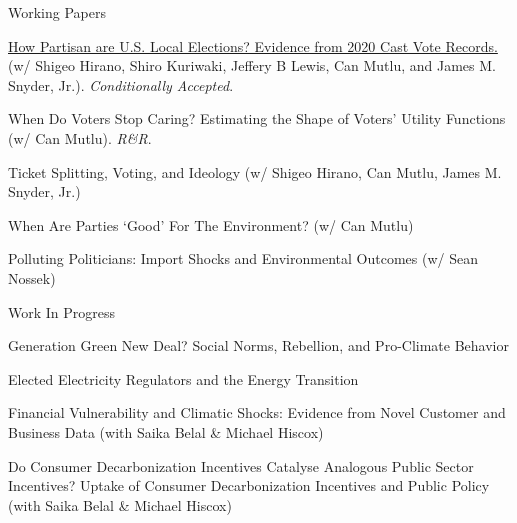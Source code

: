 \documentclass{resume}
\begin{document}
\begin{rSection}{\Large W\MakeLowercase{orking} P\MakeLowercase{apers}} \itemsep -3pt {}
\vspace{-0.7cm}

 
\item \href{https://osf.io/preprints/osf/db3mj}{How Partisan are U.S. Local Elections? Evidence from 2020 Cast Vote Records.} (w/ Shigeo Hirano, Shiro Kuriwaki, Jeffery B Lewis, Can Mutlu, and James M. Snyder, Jr.). \textit{Conditionally Accepted}.

\medskip

\item When Do Voters Stop Caring? Estimating the Shape of Voters' Utility Functions (w/ Can Mutlu). \textit{R\&R}.

\medskip

\item Ticket Splitting, Voting, and Ideology (w/ Shigeo Hirano, Can Mutlu, James M. Snyder, Jr.)

\medskip 

\item When Are Parties `Good' For The Environment?  (w/ Can Mutlu)


\medskip

\item Polluting Politicians: Import Shocks and Environmental Outcomes (w/ Sean Nossek)

\end{rSection}

\bigskip


\begin{rSection}{\Large W\MakeLowercase{ork} I\MakeLowercase{n} P\MakeLowercase{rogress}} \itemsep -2pt {}
\vspace{-0.7cm}


\item Generation Green New Deal? Social Norms, Rebellion, and Pro-Climate Behavior

\medskip

\item Elected Electricity Regulators and the
Energy Transition

\medskip


\item Financial Vulnerability and Climatic Shocks: Evidence from Novel Customer and Business Data (with Saika Belal \& Michael Hiscox)

\medskip
\item Do Consumer Decarbonization Incentives Catalyse Analogous Public Sector Incentives? Uptake of Consumer Decarbonization Incentives and Public Policy (with Saika Belal \& Michael Hiscox)

\end{rSection}
\end{document}
